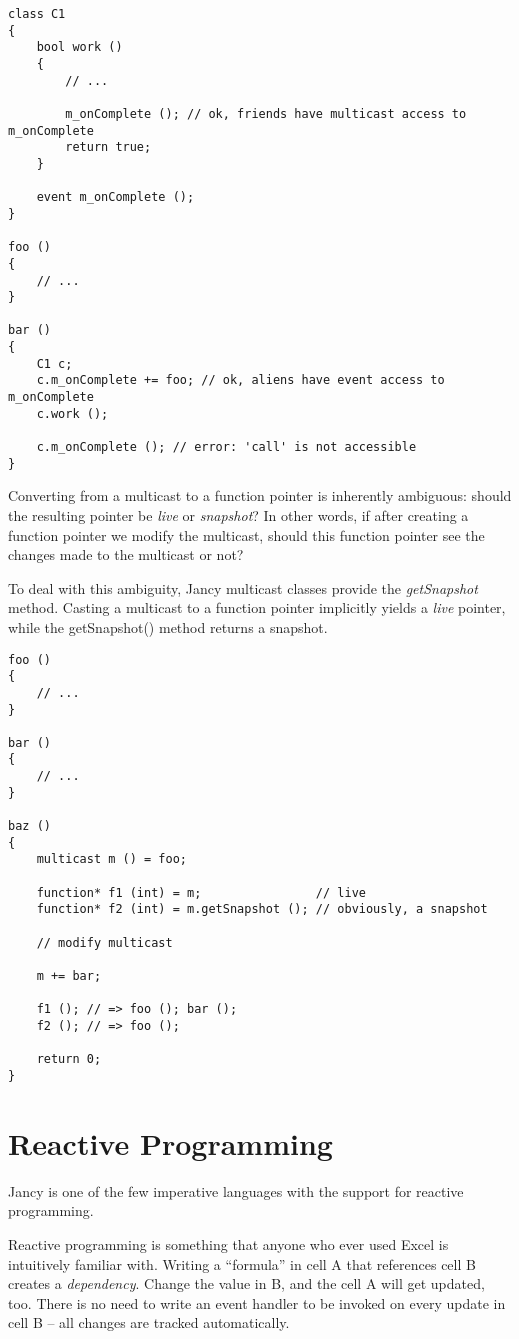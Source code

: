 \documentclass[oneside]{book}
\begin{document}
\begin{lstlisting}
class C1
{
    bool work ()
    {
        // ...

        m_onComplete (); // ok, friends have multicast access to m_onComplete
        return true;
    }

    event m_onComplete ();
}

foo ()
{
    // ...
}

bar ()
{
    C1 c;
    c.m_onComplete += foo; // ok, aliens have event access to m_onComplete
    c.work ();

    c.m_onComplete (); // error: 'call' is not accessible
}
\end{lstlisting}

Converting from a multicast to a function pointer is inherently ambiguous: should the resulting pointer be \emph{live} or \emph{snapshot}? In other words, if after creating a function pointer we modify the multicast, should this function pointer see the changes made to the multicast or not?

To deal with this ambiguity, Jancy multicast classes provide the \emph{getSnapshot} method. Casting a multicast to a function pointer implicitly yields a \emph{live} pointer, while the getSnapshot() method returns a snapshot.

\begin{lstlisting}
foo ()
{
    // ...
}

bar ()
{
    // ...
}

baz ()
{
    multicast m () = foo; 

    function* f1 (int) = m;                // live 
    function* f2 (int) = m.getSnapshot (); // obviously, a snapshot

    // modify multicast

    m += bar;

    f1 (); // => foo (); bar ();
    f2 (); // => foo ();

    return 0;
}
\end{lstlisting}

\section{Reactive Programming}

Jancy is one of the few imperative languages with the support for reactive programming.

Reactive programming is something that anyone who ever used Excel is intuitively familiar with. Writing a “formula” in cell A that references cell B creates a \emph{dependency}. Change the value in B, and the cell A will get updated, too. There is no need to write an event handler to be invoked on every update in cell B -- all changes are tracked automatically.
\end{document}
